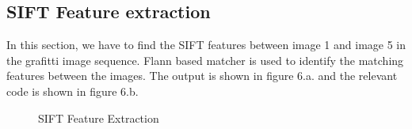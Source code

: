 \documentclass[10.5pt]{article}
\begin{document}
\begin{flushleft}
\subsection{SIFT Feature extraction}
In this section, we have to find the SIFT features between image 1 and image 5 in the grafitti image sequence. Flann based matcher is used to identify the matching features between the images. The output is shown in figure 6.a. and the relevant code is shown in figure 6.b.
\begin{figure}
    \centering
    \qquad
    \caption{SIFT Feature Extraction}
    \label{fig:example}
\end{figure}


\end{flushleft}
\end{document}
